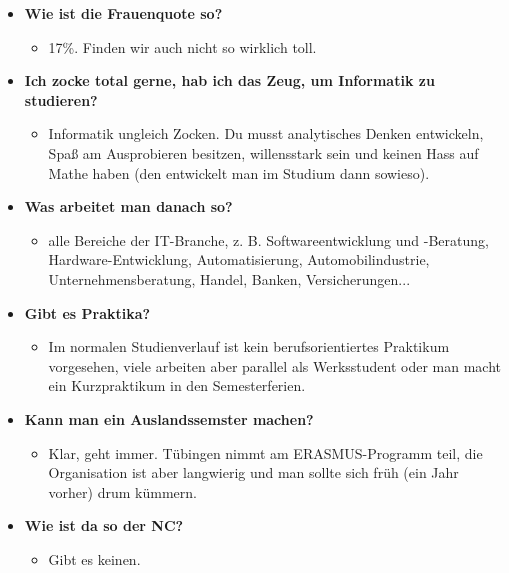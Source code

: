 \begin{large}
	\begin{itemize}
		\item \textbf{Wie ist die Frauenquote so?}
		\begin{itemize}
			\item 17\%. Finden wir auch nicht so wirklich toll.
		\end{itemize}
	\end{itemize}
	
	\begin{itemize}
		\item \textbf{Ich zocke total gerne, hab ich das Zeug, um Informatik zu studieren?}
		\begin{itemize}
			\item Informatik ungleich Zocken. Du musst analytisches Denken entwickeln, Spaß am Ausprobieren besitzen, willensstark sein und keinen Hass auf Mathe haben (den entwickelt man im Studium dann sowieso).
		\end{itemize}
	\end{itemize}
	
	\begin{itemize}
		\item \textbf{Was arbeitet man danach so?}
		\begin{itemize}
			\item alle Bereiche der IT-Branche, z. B. Softwareentwicklung und -Beratung, Hardware-Entwicklung, Automatisierung, Automobilindustrie, Unternehmensberatung, Handel, Banken, Versicherungen...
		\end{itemize}
	\end{itemize}
	
	\begin{itemize}
		\item \textbf{Gibt es Praktika?}
		\begin{itemize}
			\item Im normalen Studienverlauf ist kein berufsorientiertes Praktikum vorgesehen, viele arbeiten aber parallel als Werksstudent oder man macht ein Kurzpraktikum in den Semesterferien.
		\end{itemize}
	\end{itemize}

	\begin{itemize}
		\item \textbf{Kann man ein Auslandssemster machen?}
		\begin{itemize}
			\item  Klar, geht immer. Tübingen nimmt am ERASMUS-Programm teil, die Organisation ist aber langwierig und man sollte sich früh (ein Jahr vorher) drum kümmern.
		\end{itemize}
	\end{itemize}

	\begin{itemize}
		\item \textbf{Wie ist da so der NC?}
		\begin{itemize}
			\item Gibt es keinen.
		\end{itemize}
	\end{itemize}
\end{large}
